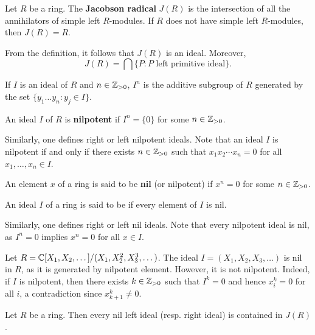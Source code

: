 \begin{definition}
Let $R$ be a ring. The \textbf{Jacobson radical} $J(R)$
is the intersection of all the annihilators of simple left $R$-modules. If $R$ does not
have simple left $R$-modules, then $J(R)=R$. 
\end{definition}

From the definition, it follows
that $J(R)$ is an ideal. Moreover, 
	\[
		J(R)=\bigcap\{P:\text{$P$ left primitive ideal}\}.
	\]

	If $I$ is an ideal of $R$ and $n\in\mathbb{Z}_{>0}$, $I^n$ is the additive subgroup of $R$ 
generated by the set $\{y_1\dots y_n:y_j\in I\}$. 

\begin{definition}
An ideal $I$ of $R$ is \textbf{nilpotent} 
if $I^n=\{0\}$ for some $n\in\mathbb{Z}_{>0}$.
\end{definition}

Similarly, one defines right or left nilpotent ideals. 
Note that an ideal $I$ is nilpotent if and only if there exists $n\in\mathbb{Z}_{>0}$ such that 
$x_1x_2\cdots x_n=0$ for all $x_1,\dots,x_n\in I$.  

\begin{definition}
	An element $x$ of a ring is said to be \textbf{nil} (or nilpotent) if $x^n=0$ for some $n\in\mathbb{Z}_{>0}$. 
\end{definition}

\begin{definition}
An ideal $I$ of a ring is said to be  if every element of $I$ is nil. 
\end{definition}

Similarly, one defines right or left nil ideals. 
Note that every nilpotent ideal is nil, as $I^n=0$ implies $x^n=0$ for all 
$x\in I$.

\begin{example}
	Let $R=\mathbb{C}[X_1,X_2,\dots]/(X_1,X_2^2,X_3^3,\dots)$. The ideal 
	$I=(X_1,X_2,X_3,\dots)$ is nil in $R$, as it is generated by nilpotent element. However, it is not nilpotent. Indeed, if $I$ is nilpotent, then there exists $k\in\mathbb{Z}_{>0}$ such that 
	$I^k=0$ and hence $x_i^k=0$ for all $i$, a contradiction since 
	$x_{k+1}^k\ne0$. 	
\end{example}

\begin{proposition}
	\label{pro:nilJ}
	Let $R$ be a ring. Then every nil left ideal (resp. right ideal) is contained in $J(R)$.
\end{proposition}

